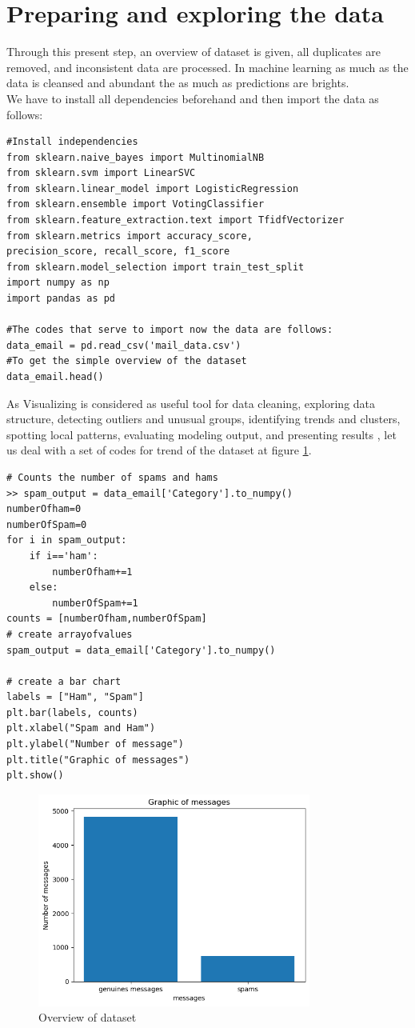 \documentclass[12pt,a4paper]{article}
\begin{document}
\section{Preparing and exploring the data}
Through this present step, an overview of dataset is given, all duplicates are removed, and inconsistent data are processed. In machine learning as much as the data is cleansed and abundant the as much as predictions are brights.\\
We have to install all dependencies beforehand and then import the data as follows:
\begin{verbatim} 
#Install independencies
from sklearn.naive_bayes import MultinomialNB
from sklearn.svm import LinearSVC
from sklearn.linear_model import LogisticRegression
from sklearn.ensemble import VotingClassifier
from sklearn.feature_extraction.text import TfidfVectorizer
from sklearn.metrics import accuracy_score,
precision_score, recall_score, f1_score
from sklearn.model_selection import train_test_split
import numpy as np 
import pandas as pd

#The codes that serve to import now the data are follows:
data_email = pd.read_csv('mail_data.csv')  
#To get the simple overview of the dataset 
data_email.head() 
\end{verbatim} 
As Visualizing is considered as useful tool for data cleaning, exploring data structure, detecting outliers and unusual
groups, identifying trends and clusters, spotting local patterns, evaluating modeling output, and
presenting results \cite{unwin2020data}, let us deal with a set of codes for trend of the dataset at figure \ref{fig:imageOverviewDataset}.
\begin{verbatim} 
# Counts the number of spams and hams
>> spam_output = data_email['Category'].to_numpy() 
numberOfham=0
numberOfSpam=0
for i in spam_output:
	if i=='ham':
		numberOfham+=1 
	else:
		numberOfSpam+=1 
counts = [numberOfham,numberOfSpam]
# create arrayofvalues
spam_output = data_email['Category'].to_numpy()

# create a bar chart
labels = ["Ham", "Spam"]
plt.bar(labels, counts)
plt.xlabel("Spam and Ham")
plt.ylabel("Number of message")
plt.title("Graphic of messages")
plt.show()
\end{verbatim}
\begin{figure}[htbp]
	\centering
	\includegraphics[width=0.8\textwidth]{../Spam/viewdataset}
	\caption{Overview of dataset}
	\label{fig:imageOverviewDataset}
\end{figure} 
\end{document}
